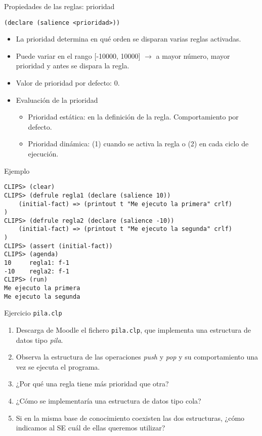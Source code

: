 \documentclass[usenames,dvipsnames,aspectratio=169]{beamer}
\begin{document}
\begin{frame}{Propiedades de las reglas: prioridad}
	\begin{center}
		\texttt{(declare (salience <prioridad>))}
	\end{center}
	\begin{itemize}
		\item La prioridad determina en qué orden se disparan varias reglas activadas.
		\item Puede variar en el rango [-10000, 10000] $\rightarrow$ a mayor número, mayor prioridad y antes se dispara la regla.
		\item Valor de prioridad por defecto: 0.
		\item Evaluación de la prioridad
		\begin{itemize}
			\item Prioridad estática: en la definición de la regla. Comportamiento por defecto.
			\item Prioridad dinámica: (1) cuando se activa la regla o (2) en cada ciclo de ejecución.
		\end{itemize}
	\end{itemize}
\end{frame}

\begin{frame}[fragile]{Ejemplo}
	\footnotesize
	\begin{verbatim}
CLIPS> (clear)
CLIPS> (defrule regla1 (declare (salience 10))
    (initial-fact) => (printout t "Me ejecuto la primera" crlf)
)
CLIPS> (defrule regla2 (declare (salience -10))
    (initial-fact) => (printout t "Me ejecuto la segunda" crlf)
)
CLIPS> (assert (initial-fact))
CLIPS> (agenda)
10     regla1: f-1
-10    regla2: f-1
CLIPS> (run)
Me ejecuto la primera
Me ejecuto la segunda
	\end{verbatim}
\end{frame}

\begin{frame}{Ejercicio \texttt{pila.clp}}
	\begin{enumerate}
		\item Descarga de Moodle el fichero \texttt{pila.clp}, que implementa una estructura de datos tipo \textit{pila}.
		\item Observa la estructura de las operaciones \textit{push} y \textit{pop} y su comportamiento una vez se ejecuta el programa.
		\item ¿Por qué una regla tiene más prioridad que otra?
		\item ¿Cómo se implementaría una estructura de datos tipo cola?
		\item Si en la misma base de conocimiento coexisten las dos estructuras, ¿cómo indicamos al SE cuál de ellas queremos utilizar?
	\end{enumerate}
\end{frame}
\end{document}
